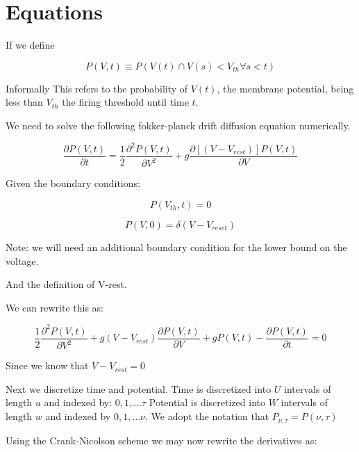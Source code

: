 \documentclass[10pt]{article}
\begin{document}
 

\section{Equations}

If we define

\begin{equation}
    P(V,t) \equiv P(V(t) \cap  V(s) < V_{th} \forall s < t)
\end{equation}

Informally This refers to the probability of $V(t)$, the membrane potential,
being less than $V_{th}$ the firing threshold until time $t$.  


We need to solve the following fokker-planck drift diffusion equation
numerically.

\begin{equation}
    \frac{\partial P(V,t)}{\partial t} =
    \frac{1}{2} \frac{\partial^2 P(V,t) } {\partial V^2} +
    g\frac{\partial[(V-V_{rest})]P(V,t)}{\partial V}
\end{equation}

Given the boundary conditions:
 
\begin{equation}
    P(V_{th},t) = 0
\end{equation}

\begin{equation}
    P(V,0) = \delta(V-V_{reset})
\end{equation}

Note: we will need an additional boundary condition for the lower
bound on the voltage.

And the definition of V-rest.


We can rewrite this as:

\begin{equation}
    \frac{1}{2} \frac{\partial^2 P(V,t) } {\partial V^2} +
    g(V-V_{rest})\frac{\partial P(V,t)}{\partial V} +
    gP(V,t) -
    \frac{\partial P(V,t)}{\partial t} = 
    0
\end{equation}

Since we know that $ V-V_{rest} = 0 $

Next we discretize time and potential. Time is discretized  into $U$
intervals of length $u$ and indexed by: $ 0,1, \dots \tau $ Potential
is discretized into $W$ intervals of length $w$ and indexed by $ 0,1,
\dots \nu $. We adopt the notation that $P_{\nu,\tau} = P(\nu,\tau)$ 

Using the Crank-Nicolson scheme we  may now rewrite the derivatives as:
\end{document}
